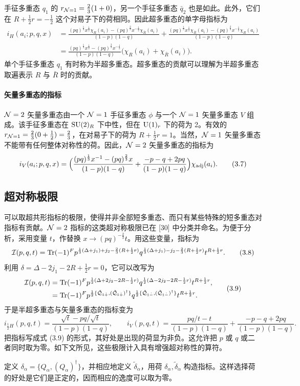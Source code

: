 手征多重态 $q_1$ 的 $r_{\mathcal{N}=1}=\frac23(1+0)$，另一个手征多重态 $\bar q_2$ 也是如此。此外，它们在 $R+\frac12 r=-\frac12$ 这个对易子下的荷相同。因此超多重态的单字母指标为
\[
\begin{aligned}
i_H(a_i;p,q,x)&=\frac{(pq)^{\frac13}x^{\frac12}\chi_R(a_i)-(pq)^{\frac23}x^{-\frac12}\chi_{\bar R}(a_i)}{(1-p)(1-q)}
+\frac{(pq)^{\frac13}x^{\frac12}\chi_{\bar R}(a_i)-(pq)^{\frac23}x^{-\frac12}\chi_R(a_i)}{(1-p)(1-q)}\\
&=\frac{(pq)^{\frac13}x^{\frac12}-(pq)^{\frac23}x^{-\frac12}}{(1-p)(1-q)}\Big(\chi_R(a_i)+\chi_{\bar R}(a_i)\Big) .
\end{aligned}
\tag{3.6}
\]
单个手征多重态 $q_1$ 有时称为半超多重态。超多重态的贡献可以理解为半超多重态取遍表示 $R$ 与 $\bar R$ 时的贡献。

\paragraph{矢量多重态的指标} $\mathcal{N}=2$ 矢量多重态由一个 $\mathcal{N}=1$ 手征多重态 $\phi$ 与一个 $\mathcal{N}=1$ 矢量多重态 $V$ 组成。该手征多重态在 $\operatorname{SU}(2)_R$ 下中性，但在 $\operatorname{U}(1)_r$ 下的荷为 2。有效的 $r_{\mathcal{N}=1}=\frac23(0+\frac12)=\frac23$，在对易子下的荷为 $R+\frac12 r=1$。当然，$\mathcal{N}=1$ 矢量多重态不能带有任何整体对称性的荷。因此，$\mathcal{N}=2$ 矢量多重态的指标为
\[
i_V(a_i;p,q,x)=\Big(\frac{(pq)^{\frac13}x^{-1}-(pq)^{\frac23}x}{(1-p)(1-q)}+\frac{-p-q+2pq}{(1-p)(1-q)}\Big)\chi_{\operatorname{adj}}(a_i) .
\tag{3.7}
\]
\subsection{超对称极限}
可以取超共形指标的极限，使得并非全部短多重态、而只有某些特殊的短多重态对指标有贡献。$\mathcal{N}=2$ 指标的这类超对称极限已在 [30] 中分类并命名。为便于分析，采用变量 $t$，作替换 $x\to(pq)^{-\frac23}t$。用这些变量，指标为
\[
\mathcal{I}(p,q,t)=\operatorname{Tr}(-1)^F p^{\frac13(\Delta+j_1)+j_2-\frac23(R+\frac12 r)}q^{\frac13(\Delta+j_1)-j_2-\frac23(R+\frac12 r)}t^{R+\frac12 r} .
\tag{3.8}
\]
利用 $\delta=\Delta-2j_1-2R+\frac12 r=0$，它可以改写为
\[
\begin{aligned}
\mathcal{I}(p,q,t)&=\operatorname{Tr}(-1)^F p^{\frac12(\Delta+2j_2-2R-\frac12 r)}q^{\frac12(\Delta-2j_2-2R-\frac12 r)}t^{R+\frac12 r},\\
&=\operatorname{Tr}(-1)^F p^{\frac12\{\tilde{\mathcal{Q}}_{1\dot+},(\tilde{\mathcal{Q}}_{1\dot+})^\dagger\}}q^{\frac12\{\tilde{\mathcal{Q}}_{1\dot-},(\tilde{\mathcal{Q}}_{1\dot-})^\dagger\}}t^{R+\frac12 r} .
\end{aligned}
\tag{3.9}
\]
于是半超多重态与矢量多重态的指标变为
\[
i_{\frac12 H}(p,q,t)=\frac{\sqrt t-pq/\sqrt t}{(1-p)(1-q)},\qquad
i_V(p,q,t)=\frac{pq/t-t}{(1-p)(1-q)}+\frac{-p-q+2pq}{(1-p)(1-q)} .
\tag{3.10}
\]
把指标写成式 (3.9) 的形式，其好处是出现的荷显为非负。这允许把 $p$ 或 $q$ 或二者同时取为零。如下文所见，这些极限计入具有增强超对称性的算符。
\begin{exercise}[3.1]
定义 $\delta_\alpha=\{Q_\alpha,(Q_\alpha)^\dagger\}$，并相应地定义 $\tilde\delta_{\dot\alpha}$，用荷 $\delta_\alpha,\tilde\delta_{\dot\alpha}$ 构造指标。这样选择荷的好处是它们是正定的，因而相应的逸度可以取为零。
\end{exercise}
